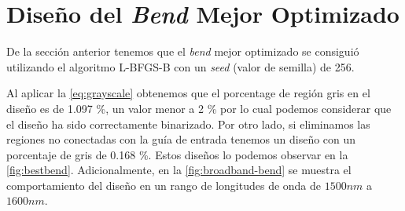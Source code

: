 
\section{Diseño del \emph{Bend} Mejor Optimizado}\label{sec:best-bend}

De la sección anterior tenemos que el \emph{bend} mejor optimizado se consiguió
utilizando el algoritmo L-BFGS-B con un \emph{seed} (valor de semilla) de 256.

Al aplicar la \autoref{eq:grayscale} obtenemos que el porcentage de región gris en el diseño
es de 1.097 \%, un valor menor a 2 \% por lo cual podemos considerar que el diseño ha sido
correctamente binarizado. Por otro lado, si eliminamos las regiones no conectadas con la guía de entrada
tenemos un diseño con un porcentaje de gris de 0.168 \%.
Estos diseños lo podemos observar en la \autoref{fig:bestbend}.
Adicionalmente, en la \autoref{fig:broadband-bend} se muestra el comportamiento del diseño
en un rango de longitudes de onda de $1500nm$ a $1600 nm$.

